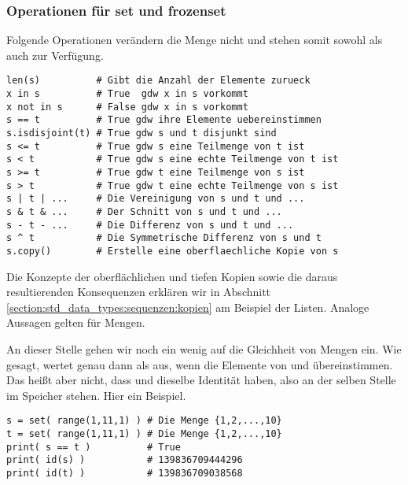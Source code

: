 \subsubsection{Operationen für set und frozenset}
\label{section:std_data_types:mengen:operationen_fuer_set_und_frozenset}
Folgende Operationen verändern die Menge nicht und stehen somit sowohl  als auch  zur Verfügung.
\begin{lstlisting}
len(s)          # Gibt die Anzahl der Elemente zurueck
x in s          # True  gdw x in s vorkommt
x not in s      # False gdw x in s vorkommt
s == t          # True gdw ihre Elemente uebereinstimmen
s.isdisjoint(t) # True gdw s und t disjunkt sind
s <= t          # True gdw s eine Teilmenge von t ist
s < t           # True gdw s eine echte Teilmenge von t ist
s >= t          # True gdw t eine Teilmenge von s ist
s > t           # True gdw t eine echte Teilmenge von s ist
s | t | ...     # Die Vereinigung von s und t und ...
s & t & ...     # Der Schnitt von s und t und ...
s - t - ...     # Die Differenz von s und t und ...
s ^ t           # Die Symmetrische Differenz von s und t
s.copy()        # Erstelle eine oberflaechliche Kopie von s
\end{lstlisting}
Die Konzepte der oberflächlichen und tiefen Kopien sowie die daraus resultierenden Konsequenzen erklären wir in Abschnitt \ref{section:std_data_types:sequenzen:kopien} am Beispiel der Listen.
Analoge Aussagen gelten für Mengen.

An dieser Stelle gehen wir noch ein wenig auf die Gleichheit von Mengen ein.
Wie gesagt, wertet  genau dann als  aus, wenn die Elemente von  und  übereinstimmen.
Das heißt aber nicht, dass  und  dieselbe Identität haben, also an der selben Stelle im Speicher stehen.
Hier ein Beispiel.
\begin{lstlisting}
s = set( range(1,11,1) ) # Die Menge {1,2,...,10}
t = set( range(1,11,1) ) # Die Menge {1,2,...,10}
print( s == t )          # True
print( id(s) )           # 139836709444296
print( id(t) )           # 139836709038568
\end{lstlisting}


